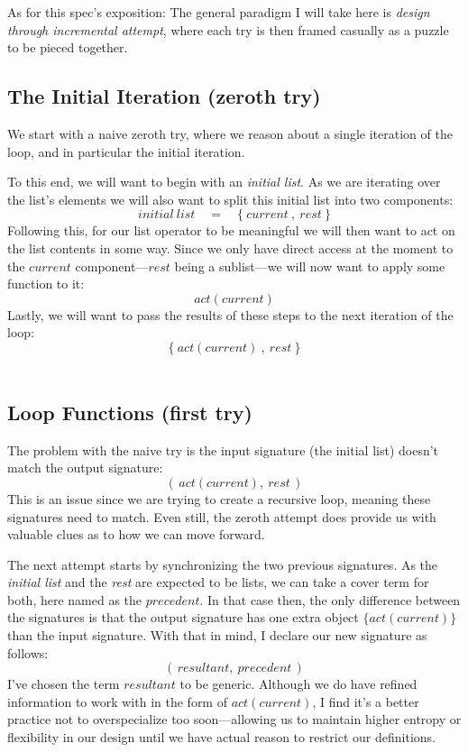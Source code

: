 \documentclass[twoside]{article}
\begin{document}
As for this spec's exposition: The general paradigm I will take here is \emph{design through incremental attempt},
where each try is then framed casually as a puzzle to be pieced together.

\subsection*{The Initial Iteration (zeroth try)}

We start with a naive zeroth try, where we reason about a single iteration of the loop, and in particular the initial iteration.

To this end, we will want to begin with an \emph{initial list}. As we are iterating over the list's elements we will
also want to split this initial list into two components:
$$ initial\ list \quad = \quad \{\ current\ ,\ rest\ \} $$
Following this, for our list operator to be meaningful we will then want to act on the list contents in some way.
Since we only have direct access at the moment to the $ current $ component---$ rest $ being a sublist---we will
now want to apply some function to it:
$$ act(current) $$
Lastly, we will want to pass the results of these steps to the next iteration of the loop:
$$ \{\ act(current)\ ,\ rest\ \} $$
\ \\

\subsection*{Loop Functions (first try)}

The problem with the naive try is the input signature (the initial list) doesn't match the output signature:
$$ (\,act(current),\ rest\,) $$
This is an issue since we are trying to create a recursive loop, meaning these signatures need to match.
Even still, the zeroth attempt does provide us with valuable clues as to how we can move forward.

The next attempt starts by synchronizing the two previous signatures. As the \emph{initial list} and the
\emph{rest} are expected to be lists, we can take a cover term for both, here named as the $ precedent $.
In that case then, the only difference between the signatures is that the output signature has one extra object
$ \{ act(current) \} $ than the input signature. With that in mind, I declare our new signature as follows:
$$ (\,resultant,\ precedent\,) $$
I've chosen the term $ resultant $ to be generic. Although we do have refined information to work with in the form
of $ act(current) $, I find it's a better practice not to overspecialize too soon---allowing us to maintain
higher entropy or flexibility in our design until we have actual reason to restrict our definitions.
\end{document}
